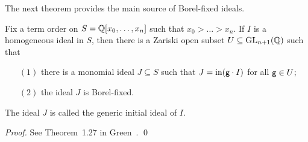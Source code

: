 The next theorem provides the main source of Borel-fixed ideals.
\begin{theorem}[Galligo] \label{galligo}
Fix a term order on $S = {\mathbb Q}[x_{0}, \dotsc, x_{n}]$ such that $x_{0}
> \dotsc > x_{n}$.  If $I$ is a homogeneous ideal in $S$, then there
is a Zariski open subset $U \subseteq \operatorname{GL}_{n+1}({\mathbb Q})$ such that
\begin{enumerate}
\item[$(1)$] there is a monomial ideal $J \subseteq S$ such that $J =
\operatorname{in}({\sf g} \cdot I )$ for all ${\sf g} \in U$;
\item[$(2)$] the ideal $J$ is Borel-fixed.
\end{enumerate}
The ideal $J$ is called the generic initial ideal of $I$.
\end{theorem}

\begin{proof}
See Theorem~1.27 in Green~\cite{MR99m:13040}. \qed
\end{proof}

